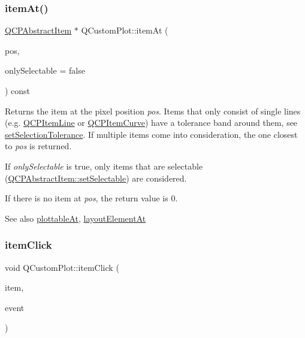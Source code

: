 \subsubsection{\texorpdfstring{item\+At()}{itemAt()}}
{\footnotesize\ttfamily \hyperlink{class_q_c_p_abstract_item}{Q\+C\+P\+Abstract\+Item} $\ast$ Q\+Custom\+Plot\+::item\+At (\begin{DoxyParamCaption}\item[{const Q\+PointF \&}]{pos,  }\item[{bool}]{only\+Selectable = {\ttfamily false} }\end{DoxyParamCaption}) const}

Returns the item at the pixel position {\itshape pos}. Items that only consist of single lines (e.\+g. \hyperlink{class_q_c_p_item_line}{Q\+C\+P\+Item\+Line} or \hyperlink{class_q_c_p_item_curve}{Q\+C\+P\+Item\+Curve}) have a tolerance band around them, see \hyperlink{class_q_custom_plot_a4dc31241d7b09680950e19e5f971ed93}{set\+Selection\+Tolerance}. If multiple items come into consideration, the one closest to {\itshape pos} is returned.

If {\itshape only\+Selectable} is true, only items that are selectable (\hyperlink{class_q_c_p_abstract_item_a8a8e32a55bc478b849756a78c2d87fd2}{Q\+C\+P\+Abstract\+Item\+::set\+Selectable}) are considered.

If there is no item at {\itshape pos}, the return value is 0.

\begin{DoxySeeAlso}{See also}
\hyperlink{class_q_custom_plot_acddbbd8b16dd633f0d94e5a736fbd8cf}{plottable\+At}, \hyperlink{class_q_custom_plot_afaa1d304e0287d140fd238e90889ef3c}{layout\+Element\+At} 
\end{DoxySeeAlso}
\hypertarget{class_q_custom_plot_ae16b51f52d2b7aebbc7e3e74e6ff2e4b}{}\label{class_q_custom_plot_ae16b51f52d2b7aebbc7e3e74e6ff2e4b} 
\subsubsection{\texorpdfstring{item\+Click}{itemClick}}
{\footnotesize\ttfamily void Q\+Custom\+Plot\+::item\+Click (\begin{DoxyParamCaption}\item[{\hyperlink{class_q_c_p_abstract_item}{Q\+C\+P\+Abstract\+Item} $\ast$}]{item,  }\item[{Q\+Mouse\+Event $\ast$}]{event }\end{DoxyParamCaption})\hspace{0.3cm}{\ttfamily [signal]}}

